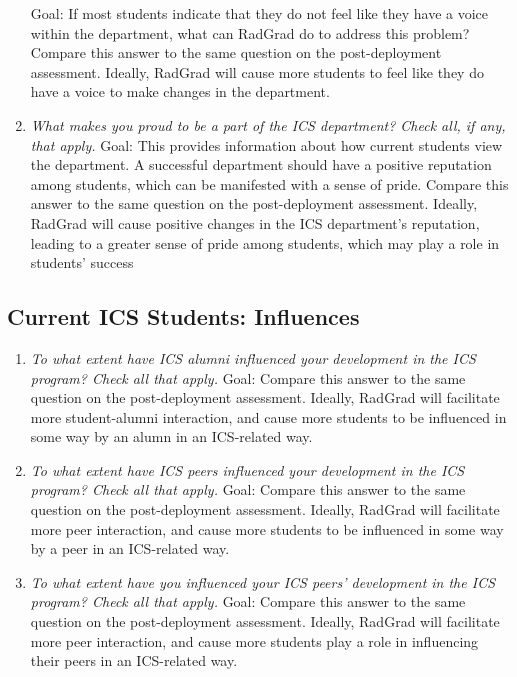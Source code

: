 \begin{enumerate}
Goal: If most students indicate that they do not feel like they have a voice within the department, what can RadGrad do to address this problem? Compare this answer to the same question on the post-deployment assessment. Ideally, RadGrad will cause more students to feel like they do have a voice to make changes in the department.
\item \textit{What makes you proud to be a part of the ICS department? Check all, if any, that apply.}
Goal: This provides information about how current students view the department. A successful department should have a positive reputation among students, which can be manifested with a sense of pride. Compare this answer to the same question on the post-deployment assessment. Ideally, RadGrad will cause positive changes in the ICS department's reputation, leading to a greater sense of pride among students, which may play a role in students' success
\end{enumerate}

\subsection{Current ICS Students: Influences}
\begin{enumerate}
\item \textit{To what extent have ICS alumni influenced your development in the ICS program? Check all that apply.}
Goal: Compare this answer to the same question on the post-deployment assessment. Ideally, RadGrad will facilitate more student-alumni interaction, and cause more students to be influenced in some way by an alumn in an ICS-related way.
\item \textit{To what extent have ICS peers influenced your development in the ICS program? Check all that apply.}
Goal: Compare this answer to the same question on the post-deployment assessment. Ideally, RadGrad will facilitate more peer interaction, and cause more students to be influenced in some way by a peer in an ICS-related way.
\item \textit{To what extent have you influenced your ICS peers’ development in the ICS program? Check all that apply.}
Goal: Compare this answer to the same question on the post-deployment assessment. Ideally, RadGrad will facilitate more peer interaction, and cause more students play a role in influencing their peers in an ICS-related way.
\end{enumerate}

